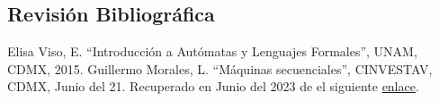 \documentclass[11pt,letterpaper]{article}
\begin{document}
\begin{multicols}{2}
  \section{Revisión Bibliográfica}  
  \begin{thebibliography}{1}
   Elisa Viso, E. ``Introducción a Autómatas y Lenguajes Formales'',
    UNAM, CDMX, 2015.
   Guillermo Morales, L.  ``Máquinas secuenciales'',
    CINVESTAV, CDMX, Junio del 21. Recuperado en Junio del 2023 de el siguiente
    \href{https://delta.cs.cinvestav.mx/~gmorales/ta/node48.html}{enlace}.
  \end{thebibliography}  
\end{multicols}
\end{document}

